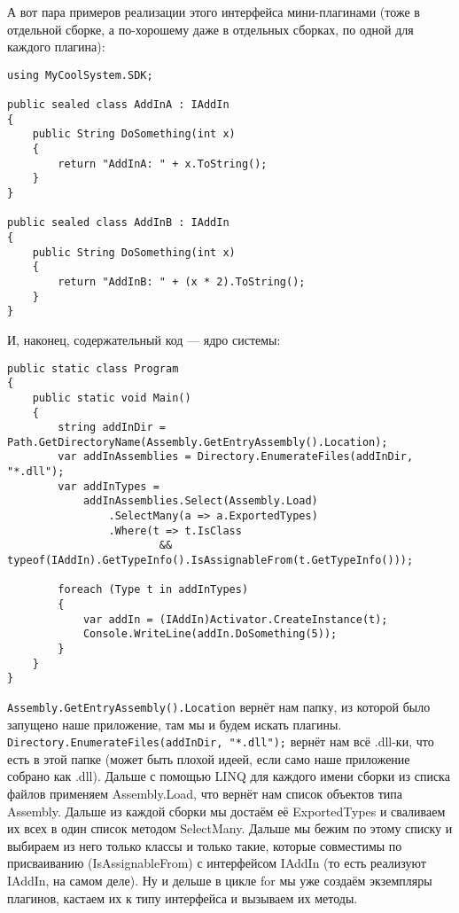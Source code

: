 \documentclass{../../text-style}
\begin{document}
А вот пара примеров реализации этого интерфейса мини-плагинами (тоже в отдельной сборке, а по-хорошему даже в отдельных сборках, по одной для каждого плагина):

\begin{verbatim}
using MyCoolSystem.SDK;

public sealed class AddInA : IAddIn
{
    public String DoSomething(int x)
    {
        return "AddInA: " + x.ToString();
    }
}

public sealed class AddInB : IAddIn
{
    public String DoSomething(int x)
    {
        return "AddInB: " + (x * 2).ToString();
    }
}
\end{verbatim}

И, наконец, содержательный код --- ядро системы:

\begin{verbatim}
public static class Program
{
    public static void Main()
    {
        string addInDir = Path.GetDirectoryName(Assembly.GetEntryAssembly().Location);
        var addInAssemblies = Directory.EnumerateFiles(addInDir, "*.dll");
        var addInTypes =
            addInAssemblies.Select(Assembly.Load)
                .SelectMany(a => a.ExportedTypes)
                .Where(t => t.IsClass 
                        && typeof(IAddIn).GetTypeInfo().IsAssignableFrom(t.GetTypeInfo()));

        foreach (Type t in addInTypes)
        {
            var addIn = (IAddIn)Activator.CreateInstance(t);
            Console.WriteLine(addIn.DoSomething(5));
        }
    }
}
\end{verbatim}

\texttt{Assembly.GetEntryAssembly().Location} вернёт нам папку, из которой было запущено наше приложение, там мы и будем искать плагины. \texttt{Directory.EnumerateFiles(addInDir, "*.dll");} вернёт нам всё .dll-ки, что есть в этой папке (может быть плохой идеей, если само наше приложение собрано как .dll). Дальше с помощью LINQ для каждого имени сборки из списка файлов применяем Assembly.Load, что вернёт нам список объектов типа Assembly. Дальше из каждой сборки мы достаём её ExportedTypes и сваливаем их всех в один список методом SelectMany. Дальше мы бежим по этому списку и выбираем из него только классы и только такие, которые совместимы по присваиванию (IsAssignableFrom) с интерфейсом IAddIn (то есть реализуют IAddIn, на самом деле). Ну и дельше в цикле for мы уже создаём экземпляры плагинов, кастаем их к типу интерфейса и вызываем их методы.
\end{document}
